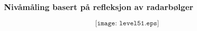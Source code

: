 \documentclass[aspectratio=169,xcolor=dvipsnames]{beamer}
\begin{document}
%
%
%
%
%
%
%
\begin{frame}
	\frametitle{Nivåmåling basert på refleksjon av radarbølger}

$$\texttt{[image: level51.eps]}$$
\end{frame}
%
%
%
\end{document}

